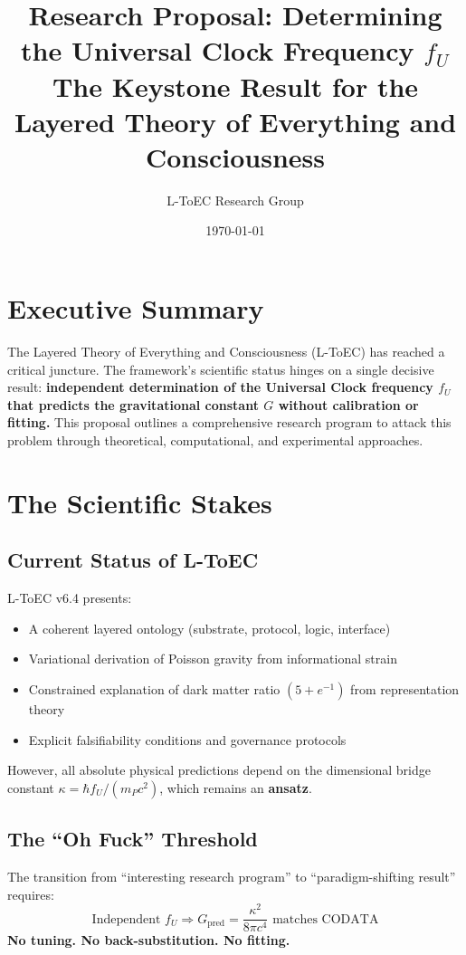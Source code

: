 \documentclass[11pt]{article}
\title{Research Proposal: Determining the Universal Clock Frequency $f_U$ \\ The Keystone Result for the Layered Theory of Everything and Consciousness}
\author{L-ToEC Research Group}
\date{\today}
\begin{document}
\maketitle

\section*{Executive Summary}
The Layered Theory of Everything and Consciousness (L-ToEC) has reached a critical juncture. 
The framework's scientific status hinges on a single decisive result: \textbf{independent 
determination of the Universal Clock frequency $f_U$ that predicts the gravitational constant 
$G$ without calibration or fitting.} This proposal outlines a comprehensive research program 
to attack this problem through theoretical, computational, and experimental approaches.

\section{The Scientific Stakes}

\subsection{Current Status of L-ToEC}
L-ToEC v6.4 presents:
\begin{itemize}
\item A coherent layered ontology (substrate, protocol, logic, interface)
\item Variational derivation of Poisson gravity from informational strain
\item Constrained explanation of dark matter ratio $(5+e^{-1})$ from representation theory
\item Explicit falsifiability conditions and governance protocols
\end{itemize}

However, all absolute physical predictions depend on the dimensional bridge constant 
$\kappa = \hbar f_U/(m_P c^2)$, which remains an \textbf{ansatz}.

\subsection{The ``Oh Fuck'' Threshold}
The transition from ``interesting research program'' to ``paradigm-shifting result'' requires:
\begin{equation}
\boxed{\text{Independent } f_U \Rightarrow G_{\text{pred}} = \frac{\kappa^2}{8\pi c^4} \text{ matches CODATA}}
\end{equation}
\textbf{No tuning. No back-substitution. No fitting.}
\end{document}
